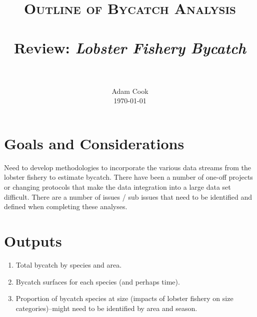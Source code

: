 \documentclass[paper=a4, fontsize=11pt]{scrartcl}	%
\title{
		\usefont{OT1}{bch}{b}{n}
		\normalfont \normalsize \textsc{Outline of Bycatch Analysis} \\ [25pt]
		\horrule{0.5pt} \\[0.4cm]
		\huge Review: \emph{Lobster Fishery Bycatch} \\
		\horrule{2pt} \\[0.5cm]
}
\author{
		\normalfont 								\normalsize
        Adam Cook\\[-3pt]		\normalsize
        \today
}
\date{}
\numberwithin{equation}{section}		%
\numberwithin{figure}{section}			%
\numberwithin{table}{section}				%
\begin{document}
\maketitle
\section*{Goals and Considerations}

Need to develop methodologies to incorporate the various data streams from the lobster fishery to estimate bycatch. There have been a number of one-off projects or changing protocols that make the data integration into a large data set difficult. There are a number of issues / sub issues that need to be identified and defined when completing these analyses.

\section*{Outputs}
\begin{enumerate}
	\item Total bycatch by species and area.
	\item Bycatch surfaces for each species (and perhaps time).
	\item Proportion of bycatch species at size (impacts of lobster fishery on size categories)--might need to be identified by area and season.

\end{enumerate}
\end{document}
